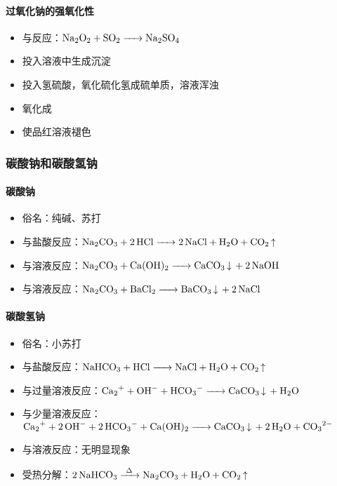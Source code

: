 \paragraph{过氧化钠的强氧化性}

\begin{itemize}
	\item 与反应：$\ce{Na2O2 + SO2 -> Na2SO4}$
	\item 投入溶液中生成沉淀
	\item 投入氢硫酸，氧化硫化氢成硫单质，溶液浑浊
	\item 氧化成
	\item 使品红溶液褪色
\end{itemize}

\subsubsection{碳酸钠和碳酸氢钠}

\paragraph{碳酸钠}

\begin{itemize}
	\item 俗名：纯碱、苏打
	\item 与盐酸反应：$\ce{Na2CO3 + 2HCl -> 2NaCl + H2O + CO2 ^}$
	\item 与溶液反应：$\ce{Na2CO3 + Ca(OH)2 -> CaCO3 v + 2NaOH}$
	\item 与溶液反应：$\ce{Na2CO3 + BaCl2 -> BaCO3 v + 2NaCl}$
\end{itemize}

\paragraph{碳酸氢钠}

\begin{itemize}
	\item 俗名：小苏打
	\item 与盐酸反应：$\ce{NaHCO3 + HCl -> NaCl + H2O + CO2 ^}$
	\item 与过量溶液反应：$\ce{Ca2+ + OH- + HCO3- -> CaCO3 v + H2O}$
	\item 与少量溶液反应：$\ce{Ca2+ + 2OH- + 2HCO3- + Ca(OH)2 -> CaCO3 v + 2H2O + CO3^2-}$
	\item 与溶液反应：无明显现象
	\item 受热分解：$\ce{2NaHCO3 ->[\Delta] Na2CO3 + H2O + CO2 ^}$
\end{itemize}

